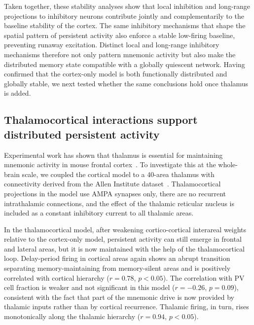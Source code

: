 \documentclass[11pt]{article}
\begin{document}
Taken together, these stability analyses show that local inhibition and long-range projections to inhibitory neurons contribute jointly and complementarily to the baseline stability of the cortex. The same inhibitory mechanisms that shape the spatial pattern of persistent activity also enforce a stable low-firing baseline, preventing runaway excitation. Distinct local and long-range inhibitory mechanisms therefore not only pattern mnemonic activity but also make the distributed memory state compatible with a globally quiescent network. Having confirmed that the cortex-only model is both functionally distributed and globally stable, we next tested whether the same conclusions hold once thalamus is added.

\subsection{Thalamocortical interactions support distributed persistent activity}

Experimental work has shown that thalamus is essential for maintaining mnemonic activity in mouse frontal cortex~\cite{guo2017maintenance,bolkan2017thalamic,schmitt2017thalamic}. To investigate this at the whole-brain scale, we coupled the cortical model to a 40-area thalamus with connectivity derived from the Allen Institute dataset~\cite{oh2014mesoscale}. Thalamocortical projections in the model use AMPA synapses only, there are no recurrent intrathalamic connections, and the effect of the thalamic reticular nucleus is included as a constant inhibitory current to all thalamic areas.

In the thalamocortical model, after weakening cortico-cortical interareal weights relative to the cortex-only model, persistent activity can still emerge in frontal and lateral areas, but it is now maintained with the help of the thalamocortical loop. Delay-period firing in cortical areas again shows an abrupt transition separating memory-maintaining from memory-silent areas and is positively correlated with cortical hierarchy ($r=0.78$, $p<0.05$). The correlation with PV cell fraction is weaker and not significant in this model ($r=-0.26$, $p=0.09$), consistent with the fact that part of the mnemonic drive is now provided by thalamic inputs rather than by cortical recurrence. Thalamic firing, in turn, rises monotonically along the thalamic hierarchy ($r=0.94$, $p<0.05$).
\end{document}
